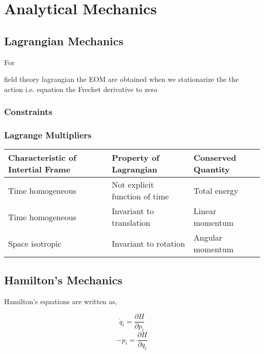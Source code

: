 \chapter{Analytical Mechanics}
\label{ch:method}
\section{Lagrangian Mechanics}
\begin{tcolorbox}
    For
\end{tcolorbox}
field theory lagrangian
the EOM are obtained when we stationarize the the action i.e. equation the Frechet derivative to zero
\subsection{Constraints}
\subsection{Lagrange Multipliers}
\begin{center}
\begin{tabularx}{0.99\textwidth} { 
		| >{\raggedright\arraybackslash}X 
		| >{\centering\arraybackslash}X 
		| >{\raggedleft\arraybackslash}X | }
	\hline
\textbf{Characteristic of Intertial Frame} & \textbf{Property of Lagrangian} & \textbf{Conserved Quantity} \\
	\hline
	Time homogeneous & Not explicit function of time & Total energy \\
	\hline
	Time homogeneous   & Invariant to translation  & Linear momentum  \\
	\hline
	Space isotropic   & Invariant to rotation  & Angular momentum  \\
	\hline
\end{tabularx}
			\end{center}
\section{Hamilton's Mechanics}
Hamilton's equations are written as,
\begin{tcolorbox}
	\begin{equation}
\dot{q}_{i} = \frac{\partial H}{\partial p_{i}}
\end{equation}
\begin{equation}
-\dot{p}_{i} = \frac{\partial H}{\partial q_{i}}
\end{equation}
\end{tcolorbox}
	
